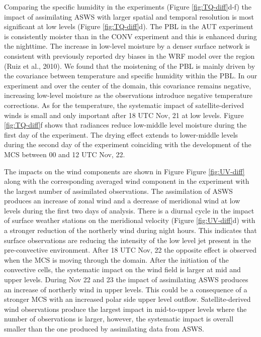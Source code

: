 \documentclass[final,5p,times,twocolumn,authoryear]{elsarticle} %
\begin{document}
Comparing the specific humidity in the experiments (Figure \ref{fig:TQ-diff}d-f) the impact of assimilating ASWS with larger spatial and temporal resolution is most significant at low levels (Figure \ref{fig:TQ-diff}d). The PBL in the AUT experiment is consistently moister than in the CONV experiment and this is enhanced during the nighttime. The increase in low-level moisture by a denser surface network is consistent with previously reported dry biases in the WRF model over the region (Ruiz et al., 2010). We found that the moistening of the PBL is mainly driven by the covariance between temperature and specific humidity within the PBL. In our experiment and over the center of the domain, this covariance remains negative, increasing low-level moisture as the observations introduce negative temperature corrections. As for the temperature, the systematic impact of satellite-derived winds is small and only important after 18 UTC Nov, 21 at low levels. Figure \ref{fig:TQ-diff}f shows that radiances reduce low-middle level moisture during the first day of the experiment. The drying effect extends to lower-middle levels during the second day of the experiment coinciding with the development of the MCS between 00 and 12 UTC Nov, 22.

The impacts on the wind components are shown in Figure Figure \ref{fig:UV-diff} along with the corresponding averaged wind component in the experiment with the largest number of assimilated observations. The assimilation of ASWS produces an increase of zonal wind and a decrease of meridional wind at low levels during the first two days of analysis. There is a diurnal cycle in the impact of surface weather stations on the meridional velocity (Figure \ref{fig:UV-diff}d) with a stronger reduction of the northerly wind during night hours. This indicates that surface observations are reducing the intensity of the low level jet present in the pre-convective environment. After 18 UTC Nov, 22 the opposite effect is observed when the MCS is moving through the domain. After the initiation of the convective cells, the systematic impact on the wind field is larger at mid and upper levels. During Nov 22 and 23 the impact of assimilating ASWS produces an increase of northerly wind in upper levels. This could be a consequence of a stronger MCS with an increased polar side upper level outflow. Satellite-derived wind observations produce the largest impact in mid-to-upper levels where the number of observations is larger, however, the systematic impact is overall smaller than the one produced by assimilating data from ASWS.
\end{document}

